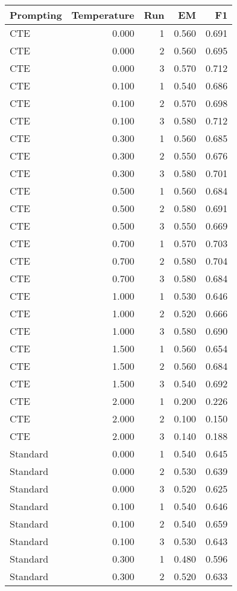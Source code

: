 \begin{tabular}{lrrrr}
\toprule
Prompting & Temperature & Run & EM & F1 \\
\midrule
CTE & 0.000 & 1 & 0.560 & 0.691 \\
CTE & 0.000 & 2 & 0.560 & 0.695 \\
CTE & 0.000 & 3 & 0.570 & 0.712 \\
CTE & 0.100 & 1 & 0.540 & 0.686 \\
CTE & 0.100 & 2 & 0.570 & 0.698 \\
CTE & 0.100 & 3 & 0.580 & 0.712 \\
CTE & 0.300 & 1 & 0.560 & 0.685 \\
CTE & 0.300 & 2 & 0.550 & 0.676 \\
CTE & 0.300 & 3 & 0.580 & 0.701 \\
CTE & 0.500 & 1 & 0.560 & 0.684 \\
CTE & 0.500 & 2 & 0.580 & 0.691 \\
CTE & 0.500 & 3 & 0.550 & 0.669 \\
CTE & 0.700 & 1 & 0.570 & 0.703 \\
CTE & 0.700 & 2 & 0.580 & 0.704 \\
CTE & 0.700 & 3 & 0.580 & 0.684 \\
CTE & 1.000 & 1 & 0.530 & 0.646 \\
CTE & 1.000 & 2 & 0.520 & 0.666 \\
CTE & 1.000 & 3 & 0.580 & 0.690 \\
CTE & 1.500 & 1 & 0.560 & 0.654 \\
CTE & 1.500 & 2 & 0.560 & 0.684 \\
CTE & 1.500 & 3 & 0.540 & 0.692 \\
CTE & 2.000 & 1 & 0.200 & 0.226 \\
CTE & 2.000 & 2 & 0.100 & 0.150 \\
CTE & 2.000 & 3 & 0.140 & 0.188 \\
Standard & 0.000 & 1 & 0.540 & 0.645 \\
Standard & 0.000 & 2 & 0.530 & 0.639 \\
Standard & 0.000 & 3 & 0.520 & 0.625 \\
Standard & 0.100 & 1 & 0.540 & 0.646 \\
Standard & 0.100 & 2 & 0.540 & 0.659 \\
Standard & 0.100 & 3 & 0.530 & 0.643 \\
Standard & 0.300 & 1 & 0.480 & 0.596 \\
Standard & 0.300 & 2 & 0.520 & 0.633 \\

\end{tabular}

